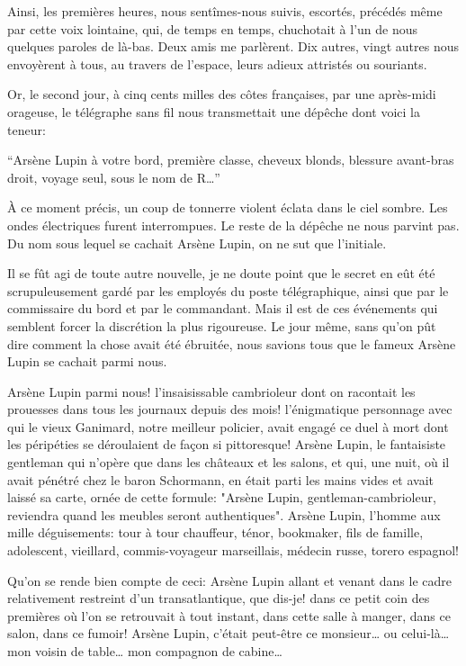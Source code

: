 \documentclass[12pt,a4paper]{book}
\begin{document}
Ainsi, les premières heures, nous sentîmes-nous suivis, escortés, précédés même par cette voix lointaine, qui, de temps en temps, chuchotait à l’un de nous quelques paroles de là-bas. Deux amis me parlèrent. Dix autres, vingt autres nous envoyèrent à tous, au travers de l’espace, leurs adieux attristés ou souriants.

Or, le second jour, à cinq cents milles des côtes françaises, par une après-midi orageuse, le télégraphe sans fil nous transmettait une dépêche dont voici la teneur:

\enquote{Arsène Lupin à votre bord, première classe, cheveux blonds, blessure avant-bras droit, voyage seul, sous le nom de R…}

À ce moment précis, un coup de tonnerre violent éclata dans le ciel sombre. Les ondes électriques furent interrompues. Le reste de la dépêche ne nous parvint pas. Du nom sous lequel se cachait Arsène Lupin, on ne sut que l’initiale.

Il se fût agi de toute autre nouvelle, je ne doute point que le secret en eût été scrupuleusement gardé par les employés du poste télégraphique, ainsi que par le commissaire du bord et par le commandant. Mais il est de ces événements qui semblent forcer la discrétion la plus rigoureuse. Le jour même, sans qu’on pût dire comment la chose avait été ébruitée, nous savions tous que le fameux Arsène Lupin se cachait parmi nous.

Arsène Lupin parmi nous! l’insaisissable cambrioleur dont on racontait les prouesses dans tous les journaux depuis des mois! l’énigmatique personnage avec qui le vieux Ganimard, notre meilleur policier, avait engagé ce duel à mort dont les péripéties se déroulaient de façon si pittoresque! Arsène Lupin, le fantaisiste gentleman qui n’opère que dans les châteaux et les salons, et qui, une nuit, où il avait pénétré chez le baron Schormann, en était parti les mains vides et avait laissé sa carte, ornée de cette formule: "Arsène Lupin, gentleman-cambrioleur, reviendra quand les meubles seront authentiques". Arsène Lupin, l’homme aux mille déguisements: tour à tour chauffeur, ténor, bookmaker, fils de famille, adolescent, vieillard, commis-voyageur marseillais, médecin russe, torero espagnol!

Qu’on se rende bien compte de ceci: Arsène Lupin allant et venant dans le cadre relativement restreint d’un transatlantique, que dis-je! dans ce petit coin des premières où l’on se retrouvait à tout instant, dans cette salle à manger, dans ce salon, dans ce fumoir! Arsène Lupin, c’était peut-être ce monsieur… ou celui-là… mon voisin de table… mon compagnon de cabine…
\end{document}
